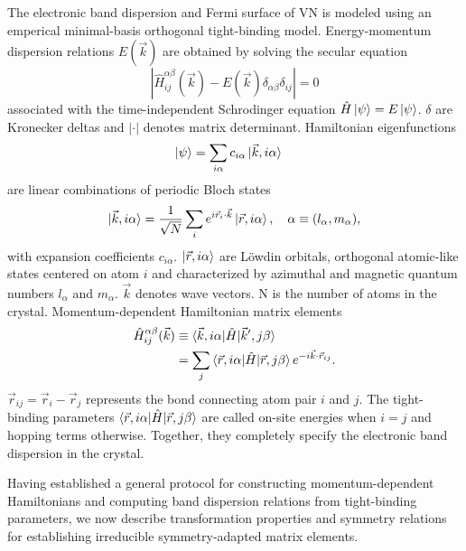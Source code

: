 \documentclass[twocolumn,showpacs,preprintnumbers,superscriptaddress,prb,floatfix,aps,10pt]{revtex4-1}
\newcommand*{\ham}{\hat{H}}
\newcommand*{\bloch}{\ket{\vec{k}, i\alpha}}
\newcommand*{\lowdin}{\ket{\vec{r}, i\alpha}}
\newcommand*{\bondvec}{\vec{r}_{ij}}
\begin{document}
The electronic band dispersion and Fermi surface of VN is modeled using an emperical minimal-basis orthogonal tight-binding model. Energy-momentum dispersion relations $E(\vec{k})$ are obtained by solving the secular equation
\begin{equation}
\label{eq:secular}
\left| \ham^{\alpha\beta}_{ij}(\vec{k}) - E(\vec{k})\delta_{\alpha\beta}\delta_{ij} \right| = 0
\end{equation}
%
associated with the time-independent Schrodinger equation $\hat{H} \ket{\psi} = E \ket{\psi}$. $\delta$ are Kronecker deltas and $|\cdot |$ denotes matrix determinant. Hamiltonian eigenfunctions
\begin{align}
\ket{\psi}  &= \sum_{i\alpha} c_{i\alpha} \bloch
\end{align}
%
are linear combinations of periodic Bloch states 
\begin{equation}
\label{eq:bloch}
\bloch = \frac{1}{\sqrt{N}} \sum_i e^{i\vec{r}_i\cdot\vec{k}} \lowdin, 
\quad
\alpha \equiv (l_\alpha,m_\alpha),
\end{equation}
%
with expansion coefficients $c_{i\alpha}$. $\lowdin$ are L\"{o}wdin orbitals, orthogonal atomic-like states centered on atom $i$ and characterized by azimuthal and magnetic quantum numbers $l_\alpha$ and $m_\alpha$. $\vec{k}$ denotes wave vectors. N is the number of atoms in the crystal. Momentum-dependent Hamiltonian matrix elements
\begin{align}
\label{eq:matrix_element}
\ham^{\alpha\beta}_{ij}(\vec{k}) &\equiv \braket{\vec{k},i\alpha | \ham | \vec{k}',j\beta} \\
&= \sum_j \braket{\vec{r},i\alpha | \ham | \vec{r},j\beta} e^{-i \vec{k}\cdot\vec{r}_{ij}} .
\end{align}
%
$\bondvec = \vec{r}_i - \vec{r}_j$ represents the bond connecting atom pair $i$ and $j$. The tight-binding parameters $\braket{\vec{r},i\alpha | \ham | \vec{r},j\beta}$ are called on-site energies when $i=j$ and hopping terms otherwise. Together, they completely specify the electronic band dispersion in the crystal.  

Having established a general protocol for constructing momentum-dependent Hamiltonians and computing band dispersion relations from tight-binding parameters, we now describe transformation properties and symmetry relations for establishing irreducible symmetry-adapted matrix elements. 
\end{document}
